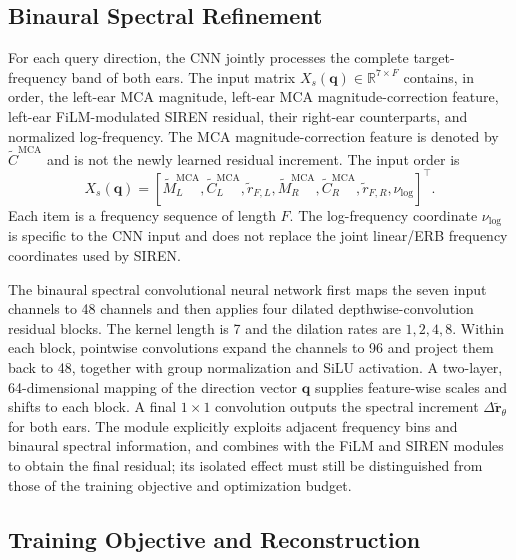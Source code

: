 \documentclass[UTF8,a4paper]{article}
\begin{document}
\subsection{Binaural Spectral Refinement}

For each query direction, the CNN jointly processes the complete target-frequency band of both ears. The input matrix $X_s(\mathbf q)\in\mathbb R^{7\times F}$ contains, in order, the left-ear MCA magnitude, left-ear MCA magnitude-correction feature, left-ear FiLM-modulated SIREN residual, their right-ear counterparts, and normalized log-frequency. The MCA magnitude-correction feature is denoted by $\widetilde C^{\mathrm{MCA}}$ and is not the newly learned residual increment. The input order is
\begin{equation}
X_s(\mathbf q)=
[\widetilde M_L^{\mathrm{MCA}},
 \widetilde C_L^{\mathrm{MCA}},\widetilde r_{F,L},
 \widetilde M_R^{\mathrm{MCA}},
 \widetilde C_R^{\mathrm{MCA}},\widetilde r_{F,R},
 \nu_{\log}]^\top .
\label{eq:cnn-input}
\end{equation}
Each item is a frequency sequence of length $F$. The log-frequency coordinate $\nu_{\log}$ is specific to the CNN input and does not replace the joint linear/ERB frequency coordinates used by SIREN.

The binaural spectral convolutional neural network first maps the seven input channels to 48 channels and then applies four dilated depthwise-convolution residual blocks. The kernel length is 7 and the dilation rates are $1,2,4,8$. Within each block, pointwise convolutions expand the channels to 96 and project them back to 48, together with group normalization and SiLU activation. A two-layer, 64-dimensional mapping of the direction vector $\mathbf q$ supplies feature-wise scales and shifts to each block. A final $1\times1$ convolution outputs the spectral increment $\Delta\widetilde{\mathbf r}_\theta$ for both ears. The module explicitly exploits adjacent frequency bins and binaural spectral information, and combines with the FiLM and SIREN modules to obtain the final residual; its isolated effect must still be distinguished from those of the training objective and optimization budget.

\subsection{Training Objective and Reconstruction}
\end{document}
